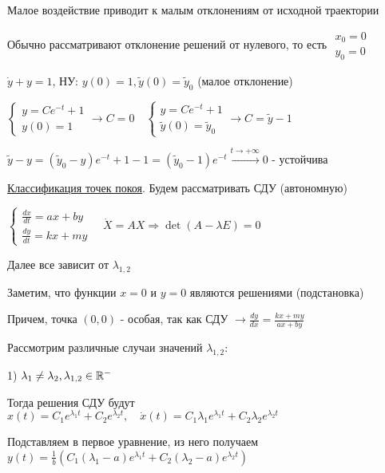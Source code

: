 \documentclass[12pt]{article}
\begin{document}
    \Nota Малое воздействие приводит к малым отклонениям от исходной траектории

    \Nota Обычно рассматривают отклонение решений от нулевого, то есть $\begin{matrix}x_0 = 0 \\ y_0 = 0\end{matrix}$

    \Ex $\dot y + y = 1$, НУ: $y(0) = 1, \tilde{y}(0) = \tilde{y}_0$ (малое отклонение)

    $\begin{cases}y = Ce^{-t} + 1 \\ y(0) = 1\end{cases} \rightarrow C = 0 \quad
    \begin{cases}y = Ce^{-t} + 1 \\ \tilde{y}(0) = \tilde{y}_0\end{cases} \to C = \tilde{y} - 1$

    $\tilde{y} - y = (\tilde{y}_0 - y) e^{-t} + 1 - 1 = (\tilde{y}_0 - 1)e^{-t} \stackrel{t \to +\infty}{\longrightarrow} 0$ - устойчива{\huge 🥳}


    \underline{Классификация точек покоя}. Будем рассматривать СДУ (автономную)

    $\begin{cases}\frac{dx}{dt} = ax + by \\ \frac{dy}{dt} = kx + my\end{cases} \quad
    \dot X = AX \Longrightarrow \det(A - \lambda E) = 0$

    Далее все зависит от $\lambda_{1,2}$

    Заметим, что функции $x = 0$ и $y = 0$ являются решениями (подстановка)

    Причем, точка $(0, 0)$ - особая, так как СДУ $\to \frac{dy}{dx} = \frac{kx + my}{ax + by}$

    Рассмотрим различные случаи значений $\lambda_{1,2}$:

    1) $\lambda_1 \neq \lambda_2, \lambda_{1,2} \in \mathbb{R}^-$

    Тогда решения СДУ будут $x(t) = C_1 e^{\lambda_1 t} + C_2 e^{\lambda_2 t}, \quad
    \dot x(t) = C_1 \lambda_1 e^{\lambda_1 t} + C_2 \lambda_2 e^{\lambda_2 t}$

    Подставляем в первое уравнение, из него получаем $y(t) = \frac{1}{b}(C_1 (\lambda_1 - a)e^{\lambda_1 t} + C_2 (\lambda_2 - a)e^{\lambda_2 t})$
\end{document}
